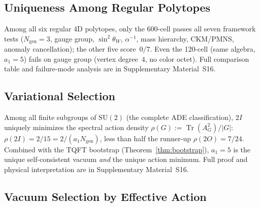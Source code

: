 \documentclass[12pt,a4paper]{article}
\theoremstyle{definition}
\begin{document}
\subsection{Uniqueness Among Regular Polytopes}
\label{sec:uniqueness_polytopes}

Among all six regular 4D polytopes, only the 600-cell passes all seven framework tests ($N_{\text{gen}} = 3$, gauge group, $\sin^2\theta_W$, $\alpha^{-1}$, mass hierarchy, CKM/PMNS, anomaly cancellation); the other five score~$0/7$.  Even the 120-cell (same algebra, $a_1 = 5$) fails on gauge group (vertex degree~$4$, no color octet).  Full comparison table and failure-mode analysis are in Supplementary Material~S16.

\subsection{Variational Selection}
\label{sec:ade_variational}

Among all finite subgroups of $\mathrm{SU}(2)$ (the complete ADE classification), $2I$ uniquely minimizes the spectral action density $\rho(G) := \operatorname{Tr}(A_G^2)/|G|$: $\rho(2I) = 2/15 = 2/(a_1 N_{\text{gen}})$, less than half the runner-up $\rho(2O) = 7/24$.  Combined with the TQFT bootstrap (Theorem~\ref{thm:bootstrap}), $a_1 = 5$ is the unique self-consistent vacuum \emph{and} the unique action minimum.  Full proof and physical interpretation are in Supplementary Material~S16.

\subsection{Vacuum Selection by Effective Action}
\label{sec:vacuum_selection}
\end{document}

